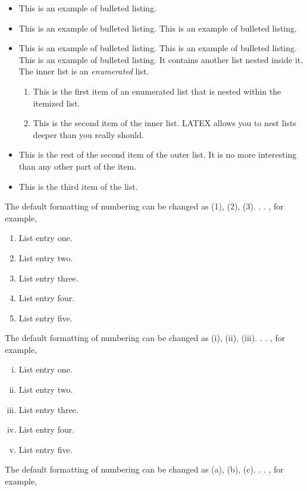 \documentclass{jpp}
\begin{document}
\begin{itemize}
\item This is an example of bulleted listing.
\item This is an example of bulleted listing. This is an example of bulleted listing.
\item This is an example of bulleted listing. This is an example of bulleted listing. This is an
example of bulleted listing. It contains another list nested inside it. The inner list is an
\textit{enumerated} list.

\begin{enumerate}
\item[1.] This is the first item of an enumerated list that is nested within the itemized list.
\item[2.] This is the second item of the inner list. LATEX allows you to nest lists deeper than
you really should.
\end{enumerate}
\item[]This is the rest of the second item of the outer list. It is no more interesting than any other
part of the item.
\item This is the third item of the list.
\end{itemize}

The default formatting of numbering can be changed as (1), (2), (3). . . , for example,

\begin{enumerate}[(5)]
\item[(1)] List entry one.
\item[(2)] List entry two.
\item[(3)] List entry three.
\item[(4)] List entry four.
\item[(5)] List entry five.
\end{enumerate}

The default formatting of numbering can be changed as (i), (ii), (iii). . . , for example,

\begin{enumerate}[(iii)]
\item[(i)] List entry one.
\item[(ii)] List entry two.
\item[(iii)] List entry three.
\item[(iv)] List entry four.
\item[(v)] List entry five.
\end{enumerate}

The default formatting of numbering can be changed as (a), (b), (c). . . , for example,
\end{document}

